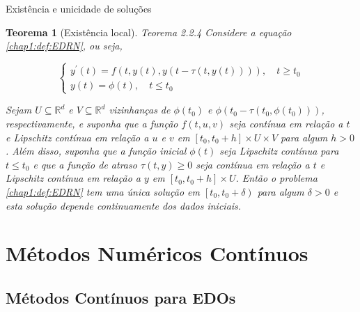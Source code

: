 \documentclass{beamer}
\theoremstyle{plain}
\newtheorem{teo}{Teorema}
\theoremstyle{definition}
\begin{document}
\begin{frame}{Existência e unicidade de soluções}

    \small
    \begin{teo}[Existência local]
        \label{chap2:teo:local_existence:EDR}
        Teorema 2.2.4 Considere a equação \ref{chap1:def:EDRN}, ou seja,

        \[
            \left\{\begin{array}{l}
                    y^{\prime}(t)=f(t, y(t), y(t-\tau(t, y(t)))), \quad t \geq t_{0}  \\
                    y(t)=\phi(t), \quad t \leq t_{0}
            \end{array}\right.
        \]

        Sejam \(U \subseteq \mathbb{R}^{d}\) e \(V \subseteq \mathbb{R}^{d}\) vizinhanças de \(\phi\left(t_{0}\right)\) e \(\phi\left(t_{0}-\tau\left(t_{0}, \phi\left(t_{0}\right)\right)\right)\), respectivamente, e suponha que a função \(f(t, u, v)\) seja contínua em relação a \(t\) e Lipschitz contínua em relação a \(u\) e \(v\) em \(\left[t_{0}, t_{0}+h\right] \times U \times V\) para algum \(h>0\). Além disso, suponha que a função inicial \(\phi(t)\) seja Lipschitz contínua para \(t \leq t_{0}\) e que a função de atraso \(\tau(t, y) \geq 0\) seja contínua em relação a \(t\) e Lipschitz contínua em relação a \(y\) em \(\left[t_{0}, t_{0}+h\right] \times U\). Então o problema \ref{chap1:def:EDRN} tem uma única solução em \(\left[t_{0}, t_{0}+\delta\right)\) para algum \(\delta>0\) e esta solução depende continuamente dos dados iniciais.

    \end{teo}
\end{frame}


\section{Métodos Numéricos Contínuos}
\subsection{Métodos Contínuos para EDOs}
\end{document}
